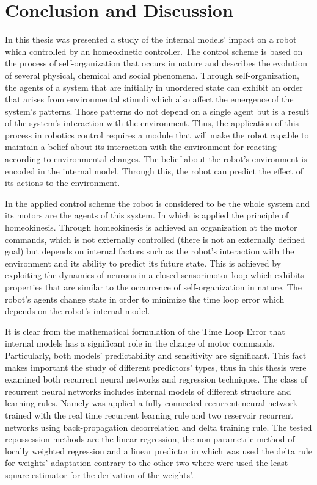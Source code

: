 \documentclass[msc,ai,logo]{infthesis}
\begin{document}
\chapter{Conclusion and Discussion}
\label{ch::cd}
In this thesis was presented a study of the internal models' impact on a robot which controlled by an homeokinetic controller. The control scheme is based on the process of self-organization that occurs in nature and describes the evolution of several physical, chemical and social phenomena. Through self-organization, the agents of a system that are initially in unordered state can exhibit an order that arises from environmental stimuli which also affect the emergence of the system's patterns. Those patterns do not depend on a single agent but is a result of the system's interaction with the environment. Thus, the application of this process in robotics control requires a module that will make the robot capable to maintain a belief about its interaction with the environment for reacting according to environmental changes.        
The belief about the robot's environment is encoded in the internal model. Through this, the robot can predict the effect of its actions to the environment.    

In the applied control scheme the robot is considered to be the whole system and its motors are the agents of this system. In which is applied the principle of homeokinesis. Through homeokinesis is achieved an organization at the motor commands, which is not externally controlled (there is not an externally defined goal) but depends on internal factors such as the robot's interaction with the environment and its ability to predict its future state. This is achieved by exploiting the dynamics of neurons in a closed sensorimotor loop which exhibits properties that are similar to the occurrence of self-organization in nature. The robot's agents change state in order to minimize the time loop error which depends on the robot's internal model.

It is clear from the mathematical formulation of the Time Loop Error that internal models has a significant role in the change of motor commands. Particularly, both models' predictability and sensitivity are significant. This fact makes important the study of different predictors' types, thus in this thesis were examined both recurrent neural networks and regression techniques. The class of recurrent neural networks includes internal models of different structure and learning rules. Namely was applied a fully connected recurrent neural network trained with the real time recurrent learning rule and two reservoir recurrent networks using back-propagation decorrelation and delta training rule. The tested repossession methods are the linear regression, the non-parametric method of locally weighted regression and a linear predictor in which was used the delta rule for weights' adaptation contrary to the other two where were used the least square estimator for the derivation of the weights'.
\end{document}
